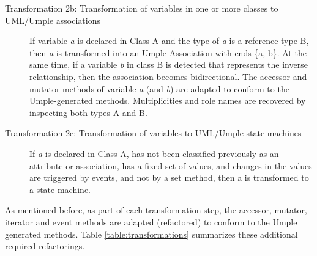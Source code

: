 \begin{description}
\begin{description}
	\item [Transformation 2b: Transformation of variables in one or more classes to UML/Umple associations]
	If variable \textit{a} is declared in Class A and the type of \textit{a} is a reference type B, then \textit{a} is transformed into an Umple Association with ends \{a, b\}. At the same time, if a variable \textit{b} in class B is detected that represents the inverse relationship, then the association becomes bidirectional. The accessor and mutator methods of variable \textit{a} (and \textit{b}) are adapted to conform to the Umple-generated methods. Multiplicities and role names are recovered by inspecting both types A and B.

	\item [Transformation 2c: Transformation of variables to UML/Umple state machines]
	If \textit{a} is declared in Class A, has not been classified previously as an attribute or association, has a fixed set of values, and changes in the values are triggered by events, and not by a set method, then a is transformed to a state machine.	
\end{description}
\end{description}

As mentioned before, as part of each transformation step, the accessor, mutator, iterator and event methods are adapted (refactored) to conform to the Umple generated methods. Table \ref{table:transformations} summarizes these additional required refactorings. 

